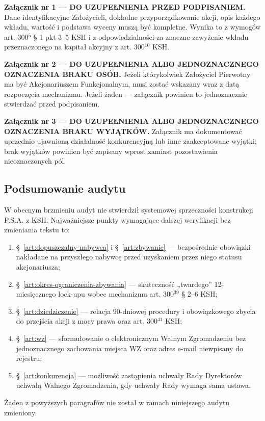 \documentclass[12pt,a4paper]{report}
\newcounter{paragraf}
\begin{document}
\textbf{Załącznik nr 1 — DO UZUPEŁNIENIA PRZED PODPISANIEM.} Dane identyfikacyjne Założycieli, dokładne przyporządkowanie akcji, opis każdego wkładu, wartość i podstawa wyceny muszą być kompletne. Wynika to z wymogów art. 300$^{5}$ § 1 pkt 3--5 KSH i z odpowiedzialności za znaczne zawyżenie wkładu przeznaczonego na kapitał akcyjny z art. 300$^{10}$ KSH.

\textbf{Załącznik nr 2 — DO UZUPEŁNIENIA ALBO JEDNOZNACZNEGO OZNACZENIA BRAKU OSÓB.} Jeżeli którykolwiek Założyciel Pierwotny ma być Akcjonariuszem Funkcjonalnym, musi zostać wskazany wraz z datą rozpoczęcia mechanizmu. Jeżeli żaden — załącznik powinien to jednoznacznie stwierdzać przed podpisaniem.

\textbf{Załącznik nr 3 — DO UZUPEŁNIENIA ALBO JEDNOZNACZNEGO OZNACZENIA BRAKU WYJĄTKÓW.} Załącznik ma dokumentować uprzednio ujawnioną działalność konkurencyjną lub inne zaakceptowane wyjątki; brak wyjątków powinien być zapisany wprost zamiast pozostawienia nieoznaczonych pól.

\subsection*{Podsumowanie audytu}

W obecnym brzmieniu audyt nie stwierdził systemowej sprzeczności konstrukcji P.S.A. z KSH. Najważniejsze punkty wymagające dalszej weryfikacji bez zmieniania tekstu to:
\begin{enumerate}
  \item §~\ref{art:dopuszczalny-nabywca} i §~\ref{art:zbywanie} — bezpośrednie obowiązki nakładane na przyszłego nabywcę przed uzyskaniem przez niego statusu akcjonariusza;
  \item §~\ref{art:okres-ograniczenia-zbywania} — skuteczność „twardego” 12-miesięcznego lock-upu wobec mechanizmu art. 300$^{39}$ § 2--6 KSH;
  \item §~\ref{art:dziedziczenie} — relacja 90-dniowej procedury i obowiązkowego zbycia do przejścia akcji z mocy prawa oraz art. 300$^{41}$ KSH;
  \item §~\ref{art:wz} — sformułowanie o elektronicznym Walnym Zgromadzeniu bez jednoznacznego zachowania miejsca WZ oraz adres e-mail niewpisany do rejestru;
  \item §~\ref{art:konkurencja} — możliwość zastąpienia uchwały Rady Dyrektorów uchwałą Walnego Zgromadzenia, gdy uchwały Rady wymaga sama ustawa.
\end{enumerate}

Żaden z powyższych paragrafów nie został w ramach niniejszego audytu zmieniony.
\end{document}
